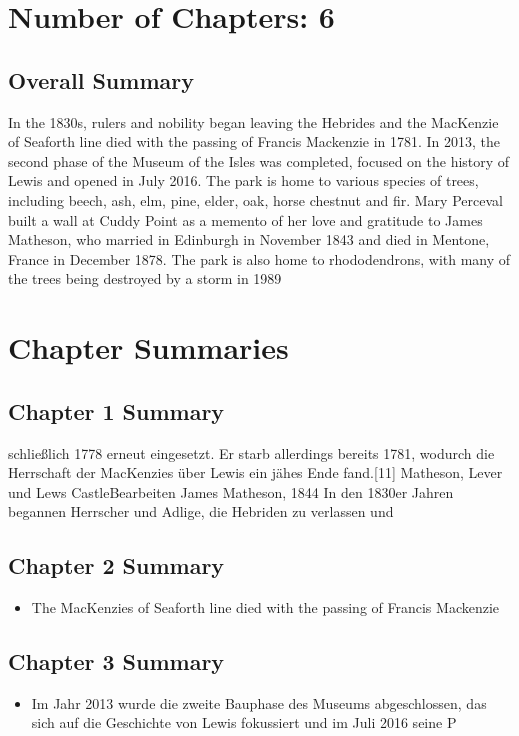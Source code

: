 \documentclass[12pt]{article}
\begin{document}
\section*{Number of Chapters: 6}
\subsection*{Overall Summary}


In the 1830s, rulers and nobility began leaving the Hebrides and the MacKenzie of Seaforth line died with the passing of Francis Mackenzie in 1781. In 2013, the second phase of the Museum of the Isles was completed, focused on the history of Lewis and opened in July 2016. The park is home to various species of trees, including beech, ash, elm, pine, elder, oak, horse chestnut and fir. Mary Perceval built a wall at Cuddy Point as a memento of her love and gratitude to James Matheson, who married in Edinburgh in November 1843 and died in Mentone, France in December 1878. The park is also home to rhododendrons, with many of the trees being destroyed by a storm in 1989
\newpage\section*{Chapter Summaries}
\subsection*{Chapter {1} Summary}
\begin{itemize}
 schließlich 1778 erneut eingesetzt. Er starb allerdings bereits 1781, wodurch die Herrschaft der MacKenzies über Lewis ein jähes Ende fand.[11] Matheson, Lever und Lews CastleBearbeiten James Matheson, 1844 In den 1830er Jahren begannen Herrscher und Adlige, die Hebriden zu verlassen und\end{itemize}
\subsection*{Chapter {2} Summary}
\begin{itemize}
 Jahr 2014 war das Projekt 2016 abgeschlossen und auf dem Gelände konnte das Museum of the Isles eröffnet werden. Eine weitere Förderung von 2,2 Mio. £ ermöglichte die Eröffnung des Hotels im November 2016.

\item  The MacKenzies of Seaforth line died with the passing of Francis Mackenzie\end{itemize}
\subsection*{Chapter {3} Summary}
\begin{itemize}
 17. November 1796/Verheiratet in Edinburgh, 9. November 1843/Gestorben in Mentone, Frankreich, 31. Dezember 1878.“[15][27]

\item  Im Jahr 2013 wurde die zweite Bauphase des Museums abgeschlossen, das sich auf die Geschichte von Lewis fokussiert und im Juli 2016 seine P\end{itemize}
\end{document}
